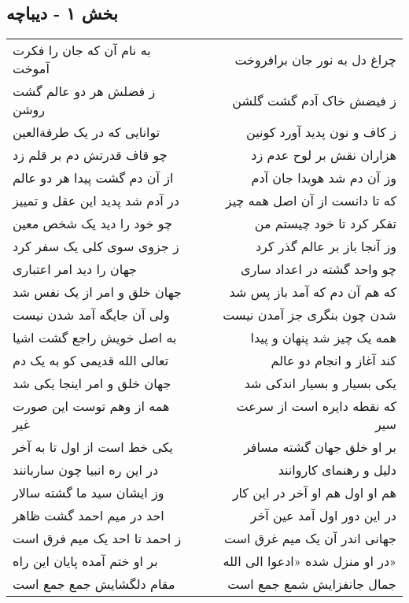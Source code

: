 \begin{center}
\section*{بخش ۱ - دیباچه}
\label{sec:sh001}
\begin{longtable}{l p{0.5cm} r}
به نام آن که جان را فکرت آموخت
&&
چراغ دل به نور جان برافروخت
\\
ز فضلش هر دو عالم گشت روشن
&&
ز فیضش خاک آدم گشت گلشن
\\
توانایی که در یک طرفةالعین
&&
ز کاف و نون پدید آورد کونین
\\
چو قاف قدرتش دم بر قلم زد
&&
هزاران نقش بر لوح عدم زد
\\
از آن دم گشت پیدا هر دو عالم
&&
وز آن دم شد هویدا جان آدم
\\
در آدم شد پدید این عقل و تمییز
&&
که تا دانست از آن اصل همه چیز
\\
چو خود را دید یک شخص معین
&&
تفکر کرد تا خود چیستم من
\\
ز جزوی سوی کلی یک سفر کرد
&&
وز آنجا باز بر عالم گذر کرد
\\
جهان را دید امر اعتباری
&&
چو واحد گشته در اعداد ساری
\\
جهان خلق و امر از یک نفس شد
&&
که هم آن دم که آمد باز پس شد
\\
ولی آن جایگه آمد شدن نیست
&&
شدن چون بنگری جز آمدن نیست
\\
به اصل خویش راجع گشت اشیا
&&
همه یک چیز شد پنهان و پیدا
\\
تعالی الله قدیمی کو به یک دم
&&
کند آغاز و انجام دو عالم
\\
جهان خلق و امر اینجا یکی شد
&&
یکی بسیار و بسیار اندکی شد
\\
همه از وهم توست این صورت غیر
&&
که نقطه دایره است از سرعت سیر
\\
یکی خط است از اول تا به آخر
&&
بر او خلق جهان گشته مسافر
\\
در این ره انبیا چون ساربانند
&&
دلیل و رهنمای کاروانند
\\
وز ایشان سید ما گشته سالار
&&
هم او اول هم او آخر در این کار
\\
احد در میم احمد گشت ظاهر
&&
در این دور اول آمد عین آخر
\\
ز احمد تا احد یک میم فرق است
&&
جهانی اندر آن یک میم غرق است
\\
بر او ختم آمده پایان این راه
&&
در او منزل شده «ادعوا الی الله»
\\
مقام دلگشایش جمع جمع است
&&
جمال جانفزایش شمع جمع است
\\

\end{longtable}
\end{center}
